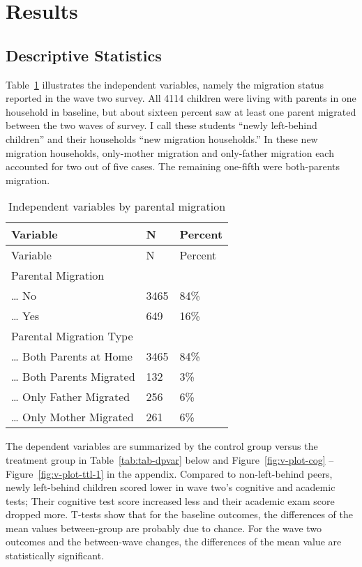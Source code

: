 \documentclass[
  man,floatsintext]{apa7}
\begin{document}
\newpage

\hypertarget{results}{%
\section{Results}\label{results}}

\hypertarget{descriptive-statistics}{%
\subsection{Descriptive Statistics}\label{descriptive-statistics}}

Table~\ref{tab:tab-idpvar} illustrates the independent variables, namely the migration status reported in the wave two survey. All 4114 children were living with parents in one household in baseline, but about sixteen percent saw at least one parent migrated between the two waves of survey. I call these students ``newly left-behind children'' and their households ``new migration households.'' In these new migration households, only-mother migration and only-father migration each accounted for two out of five cases. The remaining one-fifth were both-parents migration.

\renewcommand{\arraystretch}{0.72}

\begin{longtable}[]{@{}lll@{}}
\caption{\label{tab:tab-idpvar}Independent variables by parental migration}\tabularnewline
\toprule()
Variable & N & Percent \\
\midrule()
\endfirsthead
\toprule()
Variable & N & Percent \\
\midrule()
\endhead
Parental Migration & & \\
\ldots{} No & 3465 & 84\% \\
\ldots{} Yes & 649 & 16\% \\
Parental Migration Type & & \\
\ldots{} Both Parents at Home & 3465 & 84\% \\
\ldots{} Both Parents Migrated & 132 & 3\% \\
\ldots{} Only Father Migrated & 256 & 6\% \\
\ldots{} Only Mother Migrated & 261 & 6\% \\
\bottomrule()
\end{longtable}

\newpage

The dependent variables are summarized by the control group versus the treatment group in Table~\ref{tab:tab-dpvar} below and Figure~\ref{fig:v-plot-cog} -- Figure~\ref{fig:v-plot-ttl-1} in the appendix. Compared to non-left-behind peers, newly left-behind children scored lower in wave two's cognitive and academic tests; Their cognitive test score increased less and their academic exam score dropped more. T-tests show that for the baseline outcomes, the differences of the mean values between-group are probably due to chance. For the wave two outcomes and the between-wave changes, the differences of the mean value are statistically significant.
\end{document}
